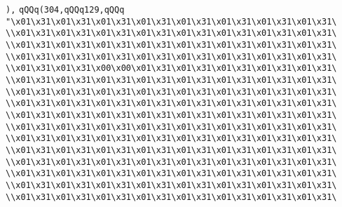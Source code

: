 \verb|),|\newline
\verb|qQQq(304,qQQq129,qQQq|\newline
\verb|"\x01\x31\x01\x31\x01\x31\x01\x31\x01\x31\x01\x31\x01\x31\x01\x31\|\newline
\verb|\\x01\x31\x01\x31\x01\x31\x01\x31\x01\x31\x01\x31\x01\x31\x01\x31\|\newline
\verb|\\x01\x31\x01\x31\x01\x31\x01\x31\x01\x31\x01\x31\x01\x31\x01\x31\|\newline
\verb|\\x01\x31\x01\x31\x01\x31\x01\x31\x01\x31\x01\x31\x01\x31\x01\x31\|\newline
\verb|\\x01\x31\x01\x31\x00\x00\x01\x31\x01\x31\x01\x31\x01\x31\x01\x31\|\newline
\verb|\\x01\x31\x01\x31\x01\x31\x01\x31\x01\x31\x01\x31\x01\x31\x01\x31\|\newline
\verb|\\x01\x31\x01\x31\x01\x31\x01\x31\x01\x31\x01\x31\x01\x31\x01\x31\|\newline
\verb|\\x01\x31\x01\x31\x01\x31\x01\x31\x01\x31\x01\x31\x01\x31\x01\x31\|\newline
\verb|\\x01\x31\x01\x31\x01\x31\x01\x31\x01\x31\x01\x31\x01\x31\x01\x31\|\newline
\verb|\\x01\x31\x01\x31\x01\x31\x01\x31\x01\x31\x01\x31\x01\x31\x01\x31\|\newline
\verb|\\x01\x31\x01\x31\x01\x31\x01\x31\x01\x31\x01\x31\x01\x31\x01\x31\|\newline
\verb|\\x01\x31\x01\x31\x01\x31\x01\x31\x01\x31\x01\x31\x01\x31\x01\x31\|\newline
\verb|\\x01\x31\x01\x31\x01\x31\x01\x31\x01\x31\x01\x31\x01\x31\x01\x31\|\newline
\verb|\\x01\x31\x01\x31\x01\x31\x01\x31\x01\x31\x01\x31\x01\x31\x01\x31\|\newline
\verb|\\x01\x31\x01\x31\x01\x31\x01\x31\x01\x31\x01\x31\x01\x31\x01\x31\|\newline
\verb|\\x01\x31\x01\x31\x01\x31\x01\x31\x01\x31\x01\x31\x01\x31\x01\x31\|\newline
